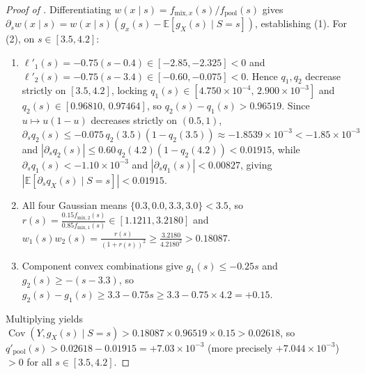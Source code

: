 \documentclass{article}
\theoremstyle{plain}
\theoremstyle{definition}
\theoremstyle{remark}
\newcommand{\E}{\mathbb{E}}
\newcommand{\Cov}{\operatorname{Cov}}
\begin{document}
\begin{proof}[Proof of ]
Differentiating $w(x\mid s) = f_{\mathrm{mix},x}(s)/f_{\mathrm{pool}}(s)$ gives $\partial_s w(x\mid s) = w(x\mid s)(g_x(s) - \E[g_X(s)\mid S=s])$, establishing (1). For (2), on $s \in [3.5, 4.2]$:
\begin{enumerate}[leftmargin=1.8em,itemsep=2pt]
    \item $\ell'_1(s) = -0.75(s - 0.4) \in [-2.85, -2.325] < 0$ and $\ell'_2(s) = -0.75(s - 3.4) \in [-0.60, -0.075] < 0$. Hence $q_1, q_2$ decrease strictly on $[3.5, 4.2]$, locking $q_1(s) \in [4.750\times 10^{-4},\, 2.900\times 10^{-3}]$ and $q_2(s) \in [0.96810,\, 0.97464]$, so $q_2(s) - q_1(s) > 0.96519$. Since $u \mapsto u(1-u)$ decreases strictly on $(0.5, 1)$, $\partial_s q_2(s) \le -0.075\, q_2(3.5)(1-q_2(3.5)) \approx -1.8539\times 10^{-3} < -1.85\times 10^{-3}$ and $|\partial_s q_2(s)| \le 0.60\, q_2(4.2)(1-q_2(4.2)) < 0.01915$, while $\partial_s q_1(s) < -1.10\times 10^{-3}$ and $|\partial_s q_1(s)| < 0.00827$, giving $|\E[\partial_s q_X(s)\mid S=s]| < 0.01915$.
    \item All four Gaussian means $\{0.3, 0.0, 3.3, 3.0\} < 3.5$, so $r(s) = \frac{0.15 f_{\mathrm{mix},2}(s)}{0.85 f_{\mathrm{mix},1}(s)} \in [1.1211, 3.2180]$ and $w_1(s)w_2(s) = \frac{r(s)}{(1+r(s))^2} \ge \frac{3.2180}{4.2180^2} > 0.18087$.
    \item Component convex combinations give $g_1(s) \le -0.25 s$ and $g_2(s) \ge -(s - 3.3)$, so $g_2(s) - g_1(s) \ge 3.3 - 0.75 s \ge 3.3 - 0.75\times 4.2 = +0.15$.
\end{enumerate}
Multiplying yields $\Cov(Y, g_X(s)\mid S=s) > 0.18087\times 0.96519\times 0.15 > 0.02618$, so $q'_{\mathrm{pool}}(s) > 0.02618 - 0.01915 = +7.03\times 10^{-3}$ (more precisely $+7.044\times 10^{-3}$) $> 0$ for all $s \in [3.5, 4.2]$.
\end{proof}
\end{document}
